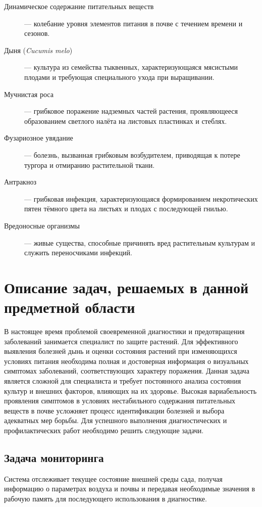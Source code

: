 \begin{description}
    \item[Динамическое содержание питательных веществ] --- колебание уровня элементов питания в почве с течением времени и сезонов.
    \item[Дыня (\textit{Cucumis melo})] --- культура из семейства тыквенных, характеризующаяся мясистыми плодами и требующая специального ухода при выращивании.
    \item[Мучнистая роса] --- грибковое поражение надземных частей растения, проявляющееся образованием светлого налёта на листовых пластинках и стеблях.
    \item[Фузариозное увядание] --- болезнь, вызванная грибковым возбудителем, приводящая к потере тургора и отмиранию растительной ткани.
    \item[Антракноз] --- грибковая инфекция, характеризующаяся формированием некротических пятен тёмного цвета на листьях и плодах с последующей гнилью.
    \item[Вредоносные организмы] --- живые существа, способные причинять вред растительным культурам и служить переносчиками инфекций.
\end{description}

\section{Описание задач, решаемых в данной предметной области}

В настоящее время проблемой своевременной диагностики и предотвращения заболеваний занимается специалист по защите растений. Для эффективного выявления болезней дынь и оценки состояния растений при изменяющихся условиях питания необходима полная и достоверная информация о визуальных симптомах заболеваний, соответствующих характеру поражения. Данная задача является сложной для специалиста и требует постоянного анализа состояния культур и внешних факторов, влияющих на их здоровье. Высокая вариабельность проявления симптомов в условиях нестабильного содержания питательных веществ в почве усложняет процесс идентификации болезней и выбора адекватных мер борьбы. Для успешного выполнения диагностических и профилактических работ необходимо решить следующие задачи.

\subsection{Задача мониторинга}

Система отслеживает текущее состояние внешней среды сада, получая информацию о параметрах воздуха и почвы и передавая необходимые значения в рабочую память для последующего использования в диагностике.

